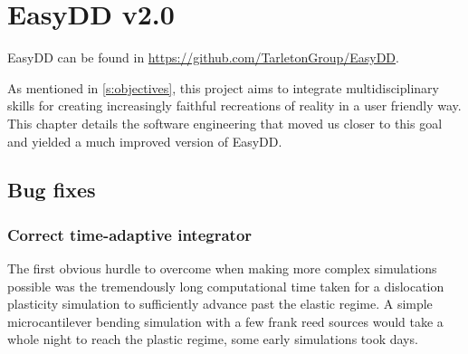 \chapter{EasyDD v2.0}
\label{c:easydd}

EasyDD can be found in \href{https://github.com/TarletonGroup/EasyDD}{https://github.com/TarletonGroup/EasyDD}.

As mentioned in \cref{s:objectives}, this project aims to integrate multidisciplinary skills for creating increasingly faithful recreations of reality in a user friendly way. This chapter details the software engineering that moved us closer to this goal and yielded a much improved version of EasyDD.

\section{Bug fixes}
\label{s:bugs}

\subsection{Correct time-adaptive integrator}
\label{ss:integrator}

The first obvious hurdle to overcome when making more complex simulations possible was the tremendously long computational time taken for a dislocation plasticity simulation to sufficiently advance past the elastic regime. A simple microcantilever bending simulation with a few frank reed sources would take a whole night to reach the plastic regime, some early simulations took days.

